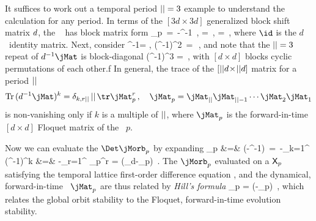 It suffices to work out a temporal period ${||}=3$ example to understand
the calculation for any period. In terms of the $[3d\!\times\!3d]$
generalized  block shift matrix $d$, the \jacobianOrb\
 has block matrix form
\beq
\jMorb_p \,=\,
\id-\shift^{-1}\jMat
\,,\quad
\shift =
\,,\quad
\jMat =
\,,
where $\id  $ is the $d$\dmn\ identity matrix.
Next, consider
\beq
\shift^{-1}\jMat =
,\;\;
(\shift^{-1}\jMat)^2 \,=\,
\,,
and note that the ${||}=3$ repeat of $\shift^{-1}\jMat$ is block-diagonal
\bea
(\shift^{-1}\jMat)^3  =
\,,
\label{stabCube}
\eea
with $[d\!\times\!{d}]$ blocks cyclic permutations of each other.f
In general, %
the trace of the
$[{||}d\!\times\!{||}d]$ matrix for a period ${||}$ {\lattstate}
\[
\Tr(\shift^{-1}\jMat)^k=\delta_{k,r\cl{}}\,\cl{}\,\tr\jMat_p^r
\,,\quad
\jMat_p = \jMat_\cl{}\jMat_{\cl{}-1}\cdots\jMat_2\jMat_1
\]
is non-vanishing only if $k$ is a multiple of ${||}$, where $\jMat_p$ is the
forward-in-time $[d\!\times\!{d}]$ Floquet matrix of the \po\ $p$.

Now we can evaluate the {\HillDet}
$\Det\jMorb_p$ by expanding
\bea
\ln\Det\jMorb_p &=&
\Tr\ln(\id-{\shift}^{-1}\jMat)
                \,=\,
-\sum_{k=1}^\infty{}\,\Tr({\shift}^{-1}\jMat)^k
    \continue
                 &=&
-\tr\sum_{r=1}^\infty{} \jMat_p^{r}
  =
\ln\det(\id_d-\jMat_p)
\,.
\label{LnDet=TrLn2}
\eea
The {\jacobianOrb} $\jMorb_p$ evaluated on a {\lattstate} $\mathsf{X}_p$
satisfying the temporal lattice first-order difference equation
, and the dynamical, forward-in-time \jacobianM\
$\jMat_p$ are thus related by \emph{Hill's formula}
\beq
\Det\jMorb_p = \det(\id  -\jMat_p)
\,,
which relates the global orbit stability to the Floquet, forward-in-time
evolution stability.

